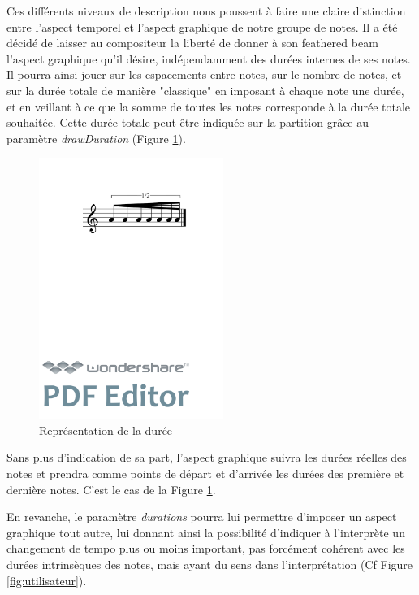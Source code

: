 \documentclass{article}
\newenvironment{code}
  {\fontfamily{pnc}\selectfont}{}
\begin{document}
Ces différents niveaux de description nous poussent à faire une claire distinction entre l'aspect temporel et l'aspect graphique de notre groupe de notes.  Il a été décidé de laisser au compositeur la liberté de donner à son feathered beam l'aspect graphique qu'il désire, indépendamment des durées internes de ses notes. Il pourra ainsi jouer sur les espacements entre notes, sur le nombre de notes, et sur la durée totale de manière "classique" en imposant à chaque note une durée, et en veillant à ce que la somme de toutes les notes corresponde à la durée totale souhaitée. Cette durée totale peut être indiquée sur la partition grâce au paramètre \textit{drawDuration} (Figure \ref{fig:fbeamduree}).

\begin{figure}[h]
\centering
\begin{code}
[ \textbackslash{}fBeam\textless{}drawDuration="true"\textgreater{}

( a/8 a a/16 a a a/32 a ) ]
\end{code}
\includegraphics[width=6cm]{img/fbeamduree.pdf}
\caption{Représentation de la durée}
\label{fig:fbeamduree}
\end{figure}

Sans plus d'indication de sa part, l'aspect graphique suivra les durées réelles des notes et prendra comme points de départ et d'arrivée les durées des première et dernière notes.  C'est le cas de la Figure \ref{fig:fbeamduree}.

En revanche, le paramètre \textit{durations} pourra lui permettre d'imposer un aspect graphique tout autre, lui donnant ainsi la possibilité d'indiquer à l'interprète un changement de tempo plus ou moins important, pas forcément cohérent avec les durées intrinsèques des notes, mais ayant du sens dans l'interprétation (Cf Figure \ref{fig:utilisateur}).
\end{document}
